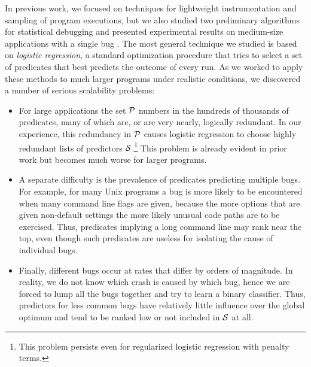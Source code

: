 \documentclass[draft]{sig-alternate}
\newcommand{\issue}[2][]{}
\begin{document}
In previous work, we focused on techniques
for lightweight instrumentation and sampling of program executions, but
we also studied two preliminary algorithms for statistical debugging and
presented experimental results on medium-size applications with a
single bug \cite{PLDI`03*141,NIPS2003_AP05}.  The most general
technique we studied is based on {\em logistic regression}, a standard
optimization procedure that tries to select a set of predicates that
best predicts the outcome of every run. As we worked to apply these
methods to much larger programs under realistic conditions, we
discovered a number of serious scalability problems:

\begin{itemize}

\item For large applications the set ${\cal P}$ numbers in the hundreds of
thousands of predicates, many of which are, or are very nearly,
logically redundant.  In our experience, this redundancy in ${\cal P}$
causes logistic regression to choose highly redundant lists of
predictors ${\cal S}$.\footnote{This problem persists even for
regularized logistic regression with penalty terms.}  This problem is
already evident in prior work \cite{PLDI`03*141} but becomes much
worse for larger programs.
\issue[Alice]{Logistic regression is not a global optimization
  technique.  The fact that predictors for less common bugs are ranked
  lower by logistic regression is a consequence of doing binary
  classification when we really should be doing multi-class
  classification.  But we can't do multi-class classification since we
  don't know the underlying bug labels. [text modified]}

\item A separate difficulty is the prevalence of predicates predicting
multiple bugs.  For example, for many Unix programs a bug is more
likely to be encountered when many command line flags are given,
because the more options that are given non-default settings the more
likely unusual code paths are to be exercised.  Thus, predicates
implying a long command line may rank near the top, even though such
predicates are useless for isolating the cause of individual bugs.

\issue{modified by Alice}
\item Finally, different bugs occur at rates that differ by orders of
magnitude.  In reality, we do not know which crash is caused by which bug, 
hence we are forced to lump all the bugs together and try to learn a binary
classifier.  Thus, predictors for less common bugs have relatively little
influence over the global optimum and tend to be ranked low or not included 
in ${\cal S}$ at all.

\end{itemize}
\end{document}
